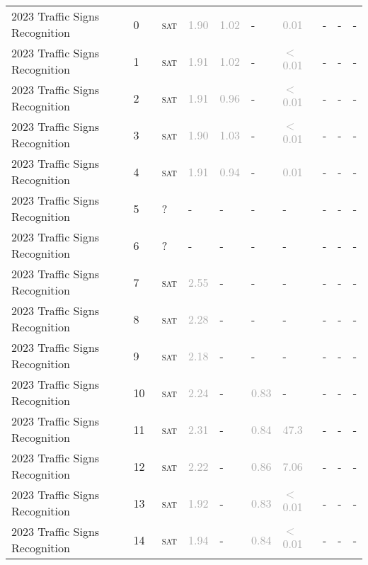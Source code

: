 \begin{center}
{\begin{longtable}{@{}llllllllll@{}}
\midrule
2023 Traffic Signs Recognition & 0 & ~\textsc{sat} & \textcolor{darkgray}{1.90} & \textcolor{darkgray}{1.02} & - & \textcolor{darkgray}{0.01} & - & - & - \\
2023 Traffic Signs Recognition & 1 & ~\textsc{sat} & \textcolor{darkgray}{1.91} & \textcolor{darkgray}{1.02} & - & \textcolor{darkgray}{$<$0.01} & - & - & - \\
2023 Traffic Signs Recognition & 2 & ~\textsc{sat} & \textcolor{darkgray}{1.91} & \textcolor{darkgray}{0.96} & - & \textcolor{darkgray}{$<$0.01} & - & - & - \\
2023 Traffic Signs Recognition & 3 & ~\textsc{sat} & \textcolor{darkgray}{1.90} & \textcolor{darkgray}{1.03} & - & \textcolor{darkgray}{$<$0.01} & - & - & - \\
2023 Traffic Signs Recognition & 4 & ~\textsc{sat} & \textcolor{darkgray}{1.91} & \textcolor{darkgray}{0.94} & - & \textcolor{darkgray}{0.01} & - & - & - \\
2023 Traffic Signs Recognition & 5 & ~? & - & - & - & - & - & - & - \\
2023 Traffic Signs Recognition & 6 & ~? & - & - & - & - & - & - & - \\
2023 Traffic Signs Recognition & 7 & ~\textsc{sat} & \textcolor{darkgray}{2.55} & - & - & - & - & - & - \\
2023 Traffic Signs Recognition & 8 & ~\textsc{sat} & \textcolor{darkgray}{2.28} & - & - & - & - & - & - \\
2023 Traffic Signs Recognition & 9 & ~\textsc{sat} & \textcolor{darkgray}{2.18} & - & - & - & - & - & - \\
2023 Traffic Signs Recognition & 10 & ~\textsc{sat} & \textcolor{darkgray}{2.24} & - & \textcolor{darkgray}{0.83} & - & - & - & - \\
2023 Traffic Signs Recognition & 11 & ~\textsc{sat} & \textcolor{darkgray}{2.31} & - & \textcolor{darkgray}{0.84} & \textcolor{darkgray}{47.3} & - & - & - \\
2023 Traffic Signs Recognition & 12 & ~\textsc{sat} & \textcolor{darkgray}{2.22} & - & \textcolor{darkgray}{0.86} & \textcolor{darkgray}{7.06} & - & - & - \\
2023 Traffic Signs Recognition & 13 & ~\textsc{sat} & \textcolor{darkgray}{1.92} & - & \textcolor{darkgray}{0.83} & \textcolor{darkgray}{$<$0.01} & - & - & - \\
2023 Traffic Signs Recognition & 14 & ~\textsc{sat} & \textcolor{darkgray}{1.94} & - & \textcolor{darkgray}{0.84} & \textcolor{darkgray}{$<$0.01} & - & - & - \\

\end{longtable}}
\end{center}
